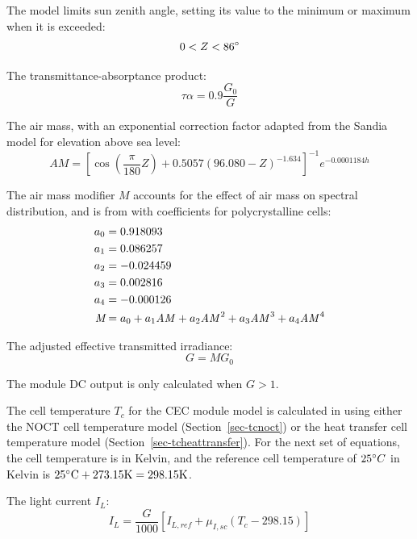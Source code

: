 \documentclass[12pt,letterpaper]{article}
\begin{document}
The model limits sun zenith angle, setting its value to the minimum or maximum when it is exceeded:
\begin{equation}
0 < Z < 86\degree  
\end{equation}

The transmittance-absorptance product:
\begin{equation}
\tau\alpha = 0.9 \frac{G_0}{G}
\end{equation}

The air mass, with an exponential correction factor adapted from the Sandia model for elevation above sea level:
\begin{equation}\label{eqn-cecam}
\textit{AM} = \left[\cos\left( \frac{\pi}{180}Z \right)+0.5057(96.080-Z)^{-1.634} \right]^{-1} e^{-0.0001184\mathit{h}}
\end{equation}

The air mass modifier $M$ accounts for the effect of air mass on spectral distribution, and is from \citet{king2004} with coefficients for polycrystalline cells:
\begin{align}
a_0 &= 0.918093 \notag\\
a_1 &= 0.086257 \notag\\
a_2 &= -0.024459 \notag\\
a_3 &= 0.002816 \notag\\
a_4 &= -0.000126 \notag\\
\textit{M} &= a_0 + a_1 \mathit{AM} + a_2 \mathit{AM}^2 + a_3\mathit{AM}^3+ a_4\mathit{AM}^4
\end{align}

The adjusted effective transmitted irradiance:
\begin{equation}\label{eqn-effectivetransmittedirradiance}
G =  MG_0
\end{equation}

The module DC output is only calculated when $G>1$.

The cell temperature $T_c$ for the CEC module model is calculated in using either the NOCT cell temperature model (Section~\ref{sec-tcnoct}) or the heat transfer cell temperature model (Section~\ref{sec-tcheattransfer}). For the next set of equations, the cell temperature is in Kelvin, and the reference cell temperature of $25\degree C$ in Kelvin is $25\degree \text{C} + 273.15 \text{K} = 298.15 \text{K}$.

The light current $I_L$:
\begin{equation}\label{eqn-lightcurrent}
I_L = \frac{G}{1000}\left[I_{L,ref} + \mu_{I,sc} (T_c - 298.15 )\right]
\end{equation}
\end{document}

